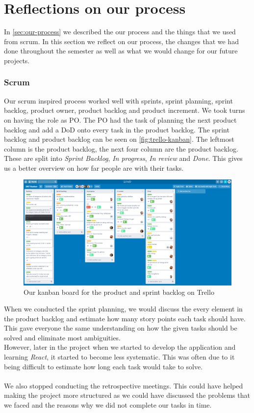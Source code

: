 \section{Reflections on our process}
In \autoref{sec:our-process} we described the our process and the things that we used from scrum.
In this section we reflect on our process, the changes that we had done throughout the semester as well as what we would change for our future projects.

\subsubsection{Scrum}
Our scrum inspired process worked well with sprints, sprint planning, sprint backlog, product owner, product backlog and product increment.
We took turns on having the role as PO.
The PO had the task of planning the next product backlog and add a DoD onto every task in the product backlog.
The sprint backlog and product backlog can be seen on \autoref{fig:trello-kanban}. 
The leftmost column is the product backlog, the next four column are the product backlog.
These are split into \textit{Sprint Backlog}, \textit{In progress}, \textit{In review} and \textit{Done}.
This gives us a better overview on how far people are with their tasks.

\begin{figure}[H]
    \centering
    \includegraphics[width=0.8\linewidth]{figures/trellopicture.PNG}
    \caption{Our kanban board for the product and sprint backlog on Trello}
    \label{fig:trello-kanban}
\end{figure}
\noindent
When we conducted the sprint planning, we would discuss the every element in the product backlog and estimate how many story points each task should have.
This gave everyone the same understanding on how the given tasks should be solved and eliminate most ambiguities. 
\\
However, later in the project when we started to develop the application and learning \textit{React}, it started to become less systematic.
This was often due to it being difficult to estimate how long each task would take to solve.
\\\\
We also stopped conducting the retrospective meetings. 
This could have helped making the project more structured as we could have discussed the problems that we faced and the reasons why we did not complete our tasks in time.

